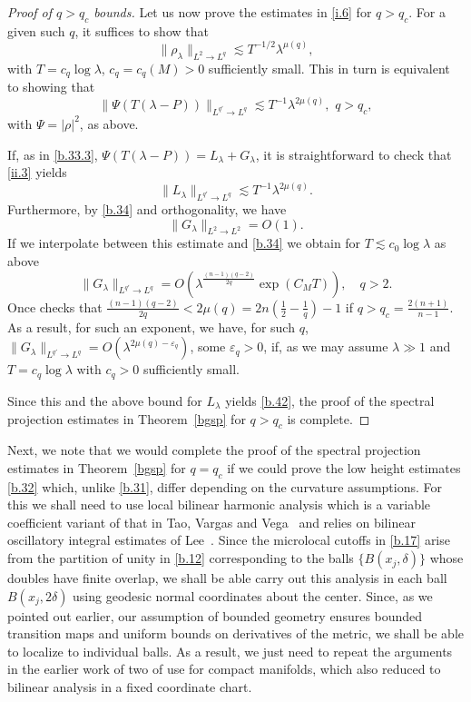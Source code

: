 \documentclass[10pt]{amsart}
\newcommand{\la}{\lambda}
\newcommand{\e}{\varepsilon}
\newcommand{\1}{{\bf 1}}
\begin{document}
\begin{proof}[Proof of $q>q_c$ bounds]
Let us now prove the estimates in \eqref{i.6} for
$q>q_c$.  For a given such $q$, it suffices to show
that
$$\|\rho_\la \|_{L^2\to L^q}\lesssim T^{-1/2}\la^{\mu(q)},
$$
with $T=c_q\log\la$, $c_q=c_q(M)>0$ sufficiently small.
This in turn is equivalent to showing that
\begin{equation}\label{b.42}
\|\Psi(T(\la-P))\|_{L^{q'}\to L^q}\lesssim T^{-1}
\la^{2\mu(q)}, \, \, q>q_c,
\end{equation}
with $\Psi=|\rho|^2$, as above.  


If, as in \eqref{b.33.3}, $\Psi(T(\la-P))=L_\la + G_\la$,
it is straightforward to check that \eqref{ii.3} yields
$$\|L_\la \|_{L^{q'}\to L^{q}}\lesssim T^{-1}\la^{2\mu(q)}.$$
Furthermore, by \eqref{b.34} and orthogonality, we have
$$\|G_\la\|_{L^2\to L^2}=O(1).$$
If we interpolate between this estimate and \eqref{b.34}
we obtain for $T\lesssim c_0 \log\la$ as above
$$\|G_\la\|_{L^{q'}\to L^q}=O(\la^{\frac{(n-1)(q-2)}{2q}}
\exp(C_MT)), \quad q>2.$$
Once checks that 
$\tfrac{ (n-1)(q-2)}{2q}
<
2\mu(q)
=2n(\tfrac12-\tfrac1q )-1$ 
if 
$q>q_c=\tfrac{2(n+1)}{n-1}$.  As a result, for such
an exponent, we have, for such $q$,
$\|G_\la\|_{L^{q'}\to L^{q}}=O(\la^{2\mu(q)-\e_q})$, some
$\e_q>0$, if, as we may assume $\la\gg 1$ and
$T=c_q\log\la$ with $c_q>0$ sufficiently small.


Since this and the above bound for $L_\la$ yields
\eqref{b.42}, the proof of the spectral projection
estimates in Theorem~\ref{bgsp} for $q>q_c$ is complete.
\end{proof}


Next, we note that we would complete the proof of the spectral projection
estimates in Theorem~\ref{bgsp} for $q=q_c$ if we could prove the low height
estimates \eqref{b.32} which, unlike \eqref{b.31}, differ depending on the 
curvature assumptions.  For this we shall need to use local bilinear harmonic
analysis which is a variable coefficient variant of that in 
Tao, Vargas and Vega~\cite{TaoVargasVega}
and relies on bilinear oscillatory integral estimates of Lee~\cite{LeeBilinear}.
Since the microlocal cutoffs in \eqref{b.17} arise from
the partition of unity in \eqref{b.12} corresponding to the balls $\{B(x_j,\delta)\}$
whose doubles have finite overlap, we shall be able carry out this analysis
in each ball $B(x_j,2\delta)$ using geodesic normal coordinates about the center.
Since, as we pointed out earlier, our assumption of bounded geometry ensures
bounded transition maps and uniform bounds on derivatives of the metric, we shall
be able to localize to individual balls.   As a result, we just need to repeat the arguments
in the earlier work of two of use \cite{HSp} for compact manifolds, which also reduced
to bilinear analysis in a fixed coordinate chart.
\end{document}
